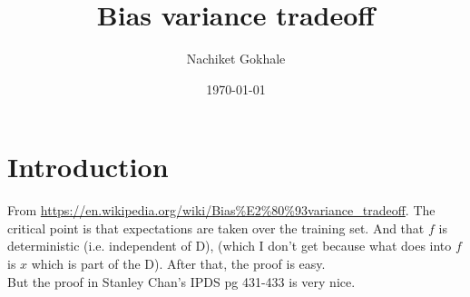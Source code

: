 \documentclass{article}
\begin{document}
\title{Bias variance tradeoff}
\author{Nachiket Gokhale}
\date{\today}
\maketitle
\section{Introduction}
From \url{https://en.wikipedia.org/wiki/Bias%E2%80%93variance_tradeoff}. The critical point is  that expectations are taken over the training set. And that $f$
  is deterministic (i.e. independent of D), (which I don't get because what does into $f$ is $x$ which is part of the D).  After that, the proof is easy. \\
But the proof in Stanley Chan's IPDS pg 431-433 is very nice.
\end{document}
